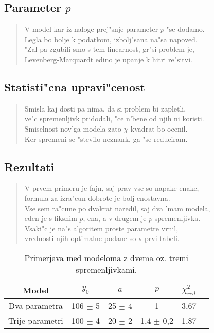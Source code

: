 \documentclass[a4paper,10pt]{article}
\begin{document}
\subsection{Parameter $p$}

\begin{verse}
V model kar iz naloge prej"snje parameter $p$ "se dodamo. \\ 
Legla bo bolje k podatkom, izbolj"sana na"sa napoved. \\
"Zal pa zgubili smo s tem linearnost, gr"si problem je, \\
Levenberg-Marquardt edino je upanje k hitri re"sitvi.
\end{verse}

\subsection{Statisti"cna upravi"cenost}
\begin{verse}
 Smisla kaj dosti pa nima, da si problem bi zapletli, \\
 ve"c spremenljivk pridodali, "ce n'bene od njih ni koristi. \\
 Smiselnost nov'ga modela zato $\chi$-kvadrat bo ocenil. \\
 Ker spremeni se "stevilo neznank, ga "se reduciram. 
\end{verse}

\subsection{Rezultati}
\begin{verse}
 V prvem primeru je fajn, saj prav vse so napake enake, \\
 formula za izra"cun dobrote je bolj enostavna. \\
 Vse sem ra"cune po dvakrat naredil, saj dva 'mam modela, \\
 eden je s fiksnim $p$, ena, a v drugem je $p$ spremenljivka. \\
 Vsaki"c je na"s algoritem proste parametre vrnil, \\
 vrednosti njih optimalne podane so v prvi tabeli. 
\end{verse}

\begin{table}[h]
 \centering
\begin{tabular}{|c|c|c|c|c|c|}
 \hline
  Model & $y_0$ & $a$ & $p$ & $\chi^2_{red}$ \\
\hline
  Dva parametra & 106 $\pm$ 5 & 25 $\pm$ 4 & 1 & 3,67 \\
\hline
  Trije parametri & 100 $\pm$ 4 & 20 $\pm$ 2 & 1,4 $\pm$ 0,2 & 1,87 \\
\hline
\end{tabular}
\caption{Primerjava med modeloma z dvema oz. tremi spremenljivkami. }
\label{tab:farmacija}
\end{table}
\end{document}
